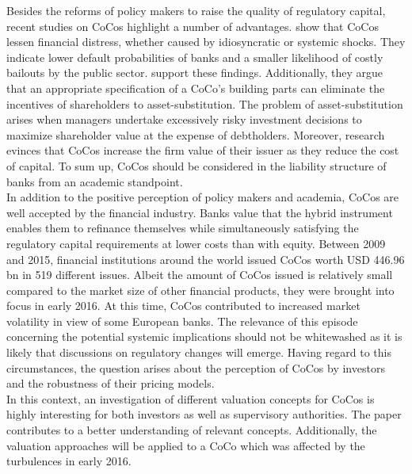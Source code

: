 Besides the reforms of policy makers to raise the quality of regulatory capital, recent studies on CoCos highlight a number of advantages. \citet{albul2015contingent} show that CoCos lessen financial distress, whether caused by idiosyncratic or systemic shocks. They indicate lower default probabilities of banks and a smaller likelihood of costly bailouts by the public sector. \citet{hilscher2014bank} support these findings. Additionally, they argue that an appropriate specification of a CoCo's building parts can eliminate the incentives of shareholders to asset-substitution. The problem of asset-substitution arises when managers undertake excessively risky investment decisions to maximize shareholder value at the expense of debtholders. \citep{bannier2010} Moreover, research evinces that CoCos increase the firm value of their issuer as they reduce the cost of capital. \citep{albul2015contingent, von2011contingent, barucci2012countercyclical} To sum up, CoCos should be considered in the liability structure of banks from an academic standpoint.\\ 

In addition to the positive perception of policy makers and academia, CoCos are well accepted by the financial industry. Banks value that the hybrid instrument enables them to refinance themselves while simultaneously satisfying the regulatory capital requirements at lower costs than with equity. \citep{europeanparliament2016} Between 2009 and 2015, financial institutions around the world issued CoCos worth USD 446.96 bn in 519 different issues. \citep{avdjiev2015coco} Albeit the amount of CoCos issued is relatively small compared to the market size of other financial products, they were brought into focus in early 2016. At this time, CoCos contributed to increased market volatility in view of some European banks. The relevance of this episode concerning the potential systemic implications should not be whitewashed as it is likely that discussions on regulatory changes will emerge. Having regard to this circumstances, the question arises about the perception of CoCos by investors and the robustness of their pricing models. \citep{europeanparliament2016} \\

In this context, an investigation of different valuation concepts for CoCos is highly interesting for both investors as well as supervisory authorities. The paper contributes to a better understanding of relevant concepts. Additionally, the valuation approaches will be applied to a CoCo which was affected by the turbulences in early 2016.

